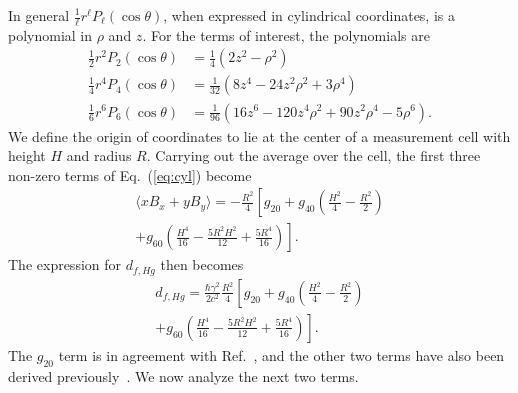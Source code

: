 \documentclass[preprint,12pt]{elsarticle}
\begin{document}
In general $\frac{1}{\ell}r^\ell P_\ell(\cos\theta)$, when expressed
in cylindrical coordinates, is a polynomial in $\rho$ and $z$.  For
the terms of interest, the polynomials are
\begin{align}
\frac{1}{2}r^2P_2(\cos\theta)&=\frac{1}{4}\left(2z^2-\rho^2\right)\\
\frac{1}{4}r^4P_4(\cos\theta)&=\frac{1}{32}\left(8z^{4}-24z^{2}\rho^{2}+3\rho^{4}\right)\\
\frac{1}{6}r^6P_6(\cos\theta)&=\frac{1}{96}\left(16z^{6}-120z^{4}\rho^{2}+90z^{2}\rho^{4}-5\rho^{6}\right).
\end{align}
We define the origin of coordinates to lie at the center of a
measurement cell with height $H$ and radius $R$.  Carrying out the
average over the cell, the first three non-zero terms of
Eq.~(\ref{eq:cyl}) become
\begin{multline}
\label{eq:xbc}
  \langle xB_x+yB_y\rangle
=-\frac{R^{2}}{4}\left[g_{20}
+g_{40}\left(\frac{H^{2}}{4}-\frac{R^2}{2}\right)\right.\\
  \left.+g_{60}\left(\frac{H^{4}}{16}-\frac{5R^2H^2}{12}+\frac{5R^4}{16}\right)\right].
\end{multline}
The expression for $d_{f,Hg}$ then becomes
\begin{multline}
d_{f,Hg}=\frac{\hbar\gamma^{2}}{2c^{2}}\frac{R^2}{4}
\left[g_{20}
+g_{40}\left(\frac{H^{2}}{4}-\frac{R^2}{2}\right)\right.\\
  \left.+g_{60}\left(\frac{H^{4}}{16}-\frac{5R^2H^2}{12}+\frac{5R^4}{16}\right)\right].
\end{multline}
The $g_{20}$ term is in agreement with Ref.~\cite{bib:pignol-roccia},
and the other two terms have also been derived
previously~\cite{bib:pignol-priv}.  We now analyze the next two terms.

\end{document}
